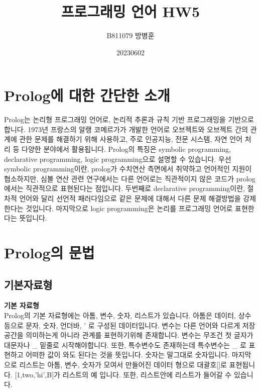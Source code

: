 \documentclass{article}
\title{프로그래밍 언어 HW5}
\author{B811079 방병훈}
\date{20230602}
\begin{document}
\maketitle
\section{Prolog에 대한 간단한 소개}
Prolog는 논리형 프로그래밍 언어로, 논리적 추론과 규칙 기반 프로그래밍을 기반으로 합니다.
1973년 프랑스의 알랭 코메르가가 개발한 언어로 오브젝트와 오브젝트 간의 관계에 관한 문제를 해결하기 위해 사용하고, 주로 인공지능, 전문 시스템, 자연 언어 처리 등 다양한 분야에서 활용됩니다. Prolog의 특징은 symbolic programming, declarative programming, logic programming으로 설명할 수 있습니다. 우선 symbolic programming이란, prolog가 수치연산 측면에서 취약하고 언어적인 지원이 협소하지만, 심볼 연산 관련 연구에서는 다른 언어로는 직관적이지 않은 코드가 prolog에서는 직관적으로 표현된다는 점입니다. 두번째로 declarative programming이란, 절차적 언어와 달리 선언적 패러다임으로 같은 문제에 대해서 다른 문제 해결방법을 강제한다는 것입니다. 마지막으로 logic programming은 논리를 프로그래밍 언어로 표현한다는 뜻입니다.
\section{Prolog의 문법}
\subsection{기본자료형}
{\bf 기본 자료형}\\
Prolog의 기본 자료형에는 아톰, 변수, 숫자, 리스트가 있습니다. 아톰은 데이터, 상수등으로 문자, 숫자, 언더바, ' 로 구성된 데이터입니다. 변수는 다른 언어와 다르게 저장공간을 의미하는게 아니라 관계를 표현하기위해 존재합니다. 변수는 무조건 첫 글자가 대문자나 \_ 밑줄로 시작해야합니다. 또한, 특수변수도 존재하는데 특수변수는 \_ 로 표현하고 어떠한 값이 와도 된다는 것을 뜻입니다. 숫자는 말그대로 숫자입니다. 마지막으로 리스트는 아톰, 변수, 숫자가 모여서 만들어진 데이터 형으로 대괄호[]로 표현됩니다. [1,two,'hi',B]가 리스트의 예 입니다. 또한, 리스트안에 리스트가 들어갈 수 있습니다. \\
\end{document}
